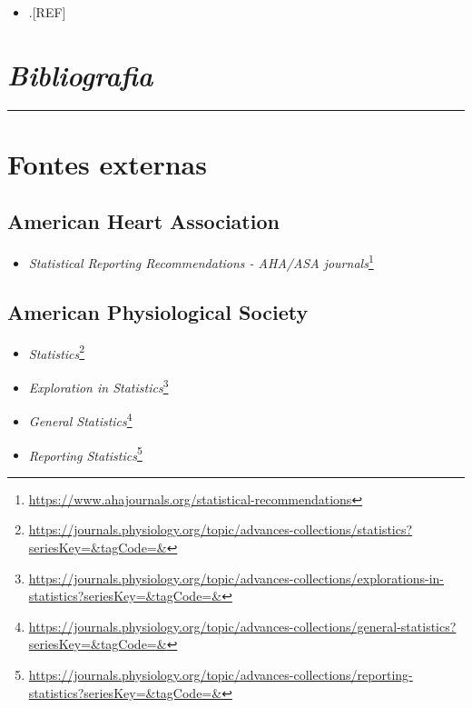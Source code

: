 \documentclass[
  a4paper,
]{book}
\providecommand{\tightlist}{%
  \setlength{\itemsep}{0pt}\setlength{\parskip}{0pt}}
\renewcommand{\href}[2]{#2\footnote{\url{#1}}}
\begin{document}
\begin{itemize}
\tightlist
\item
  .{[}REF{]}
\end{itemize}


\hypertarget{bibliografia}{%
\chapter*{\texorpdfstring{\emph{Bibliografia}}{Bibliografia}}\label{bibliografia}}

\markboth{}{}
\par\noindent\rule{\textwidth}{0.05in}

\hypertarget{fontes-externas}{%
\chapter*{\texorpdfstring{\textbf{Fontes externas}}{Fontes externas}}\label{fontes-externas}}

\hypertarget{american-heart-association}{%
\section*{American Heart Association}\label{american-heart-association}}

\begin{itemize}
\tightlist
\item
  \href{https://www.ahajournals.org/statistical-recommendations}{\emph{Statistical Reporting Recommendations - AHA/ASA journals}}
\end{itemize}

\hypertarget{american-physiological-society}{%
\section*{American Physiological Society}\label{american-physiological-society}}

\begin{itemize}
\item
  \href{https://journals.physiology.org/topic/advances-collections/statistics?seriesKey=\&tagCode=\&}{\emph{Statistics}}
\item
  \href{https://journals.physiology.org/topic/advances-collections/explorations-in-statistics?seriesKey=\&tagCode=\&}{\emph{Exploration in Statistics}}
\item
  \href{https://journals.physiology.org/topic/advances-collections/general-statistics?seriesKey=\&tagCode=\&}{\emph{General Statistics}}
\item
  \href{https://journals.physiology.org/topic/advances-collections/reporting-statistics?seriesKey=\&tagCode=\&}{\emph{Reporting Statistics}}
\end{itemize}
\end{document}
